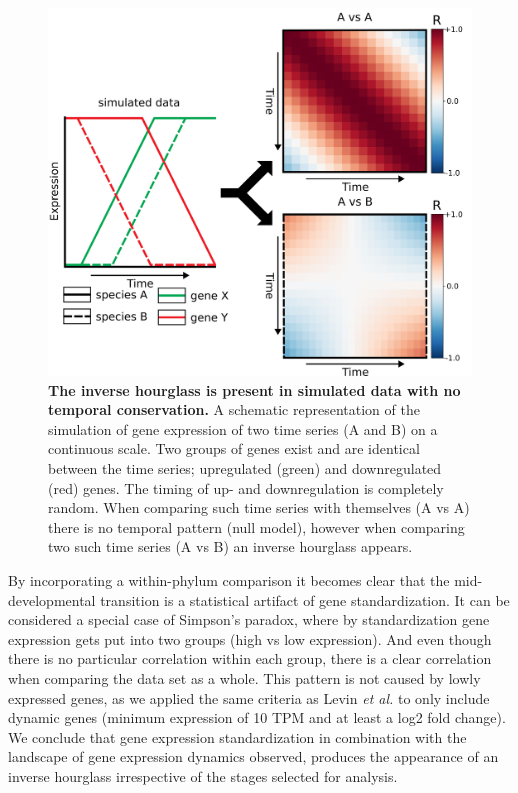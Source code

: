 \begin{figure}
    \center
    \includegraphics[width=0.8\linewidth]{ch.hourglass/images/sim_explanation.png}
    \caption{\textbf{The inverse hourglass is present in simulated data with no temporal conservation.} A schematic representation of the simulation of gene expression of two time series (A and B) on a continuous scale. Two groups of genes exist and are identical between the time series; upregulated (green) and downregulated (red) genes. The timing of up- and downregulation is completely random. When comparing such time series with themselves (A vs A) there is no temporal pattern (null model), however when comparing two such time series (A vs B) an inverse hourglass appears. }
    \label{fig:sim_explanation}
\end{figure}

By incorporating a within-phylum comparison it becomes clear that the mid-developmental transition is a statistical artifact of gene standardization. It can be considered a special case of Simpson's paradox, where by standardization gene expression gets put into two groups (high vs low expression). And even though there is no particular correlation within each group, there is a clear correlation when comparing the data set as a whole\cite{Saccenti2023}. This pattern is not caused by lowly expressed genes, as we applied the same criteria as Levin \textit{et al.} to only include dynamic genes (minimum expression of 10 TPM and at least a log2 fold change). We conclude that gene expression standardization in combination with the landscape of gene expression dynamics observed, produces the appearance of an inverse hourglass irrespective of the stages selected for analysis.

